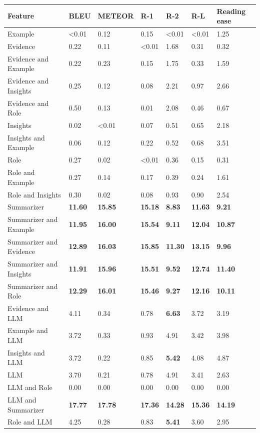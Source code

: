 \begin{tabular}{|l|l|l|l|l|l|l|}
\hline
\textbf{Feature} & BLEU & METEOR & R-1 & R-2 & R-L & Reading ease \\
 \hline
 Example & \textless{}0.01 & 0.12 & 0.15 & \textless{}0.01 & \textless{}0.01 & 1.25 \\
 \hline
 Evidence & 0.22 & 0.11 & \textless{}0.01 & 1.68 & 0.31 & 0.32 \\
 \hline
 Evidence and Example & 0.22 & 0.23 & 0.15 & 1.75 & 0.33 & 1.59 \\
 \hline
 Evidence and Insights & 0.25 & 0.12 & 0.08 & 2.21 & 0.97 & 2.66 \\
 \hline
 Evidence and Role & 0.50 & 0.13 & 0.01 & 2.08 & 0.46 & 0.67 \\
 \hline
 Insights & 0.02 & \textless{}0.01 & 0.07 & 0.51 & 0.65 & 2.18 \\
 \hline
 Insights and Example & 0.06 & 0.12 & 0.22 & 0.52 & 0.68 & 3.51 \\
 \hline
 Role & 0.27 & 0.02 & \textless{}0.01 & 0.36 & 0.15 & 0.31 \\
 \hline
 Role and Example & 0.27 & 0.14 & 0.17 & 0.39 & 0.24 & 1.61 \\
 \hline
 Role and Insights & 0.30 & 0.02 & 0.08 & 0.93 & 0.90 & 2.54 \\
 \hline
 Summarizer & \textbf{11.60} & \textbf{15.85} & \textbf{15.18} & \textbf{8.83} & \textbf{11.63} & \textbf{9.21} \\
 \hline
 Summarizer and Example & \textbf{11.95} & \textbf{16.00} & \textbf{15.54} & \textbf{9.11} & \textbf{12.04} & \textbf{10.87} \\
 \hline
 Summarizer and Evidence & \textbf{12.89} & \textbf{16.03} & \textbf{15.85} & \textbf{11.30} & \textbf{13.15} & \textbf{9.96} \\
 \hline
 Summarizer and Insights & \textbf{11.91} & \textbf{15.96} & \textbf{15.51} & \textbf{9.52} & \textbf{12.74} & \textbf{11.40} \\
 \hline
 Summarizer and Role & \textbf{12.29} & \textbf{16.01} & \textbf{15.46} & \textbf{9.27} & \textbf{12.16} & \textbf{10.11} \\
 \hline
 Evidence and LLM & 4.11 & 0.34 & 0.78 & \textbf{6.63} & 3.72 & 3.19 \\
 \hline
 Example and LLM & 3.72 & 0.33 & 0.93 & 4.91 & 3.42 & 3.98 \\
 \hline
 Insights and LLM & 3.72 & 0.22 & 0.85 & \textbf{5.42} & 4.08 & 4.87 \\
 \hline
 LLM & 3.70 & 0.21 & 0.78 & 4.91 & 3.41 & 2.63 \\
 \hline
 LLM and Role & 0.00 & 0.00 & 0.00 & 0.00 & 0.00 & 0.00 \\
 \hline
 LLM and Summarizer & \textbf{17.77} & \textbf{17.78} & \textbf{17.36} & \textbf{14.28} & \textbf{15.36} & \textbf{14.19} \\
 \hline
 Role and LLM & 4.25 & 0.28 & 0.83 & \textbf{5.41} & 3.60 & 2.95 \\
\hline
\end{tabular}
